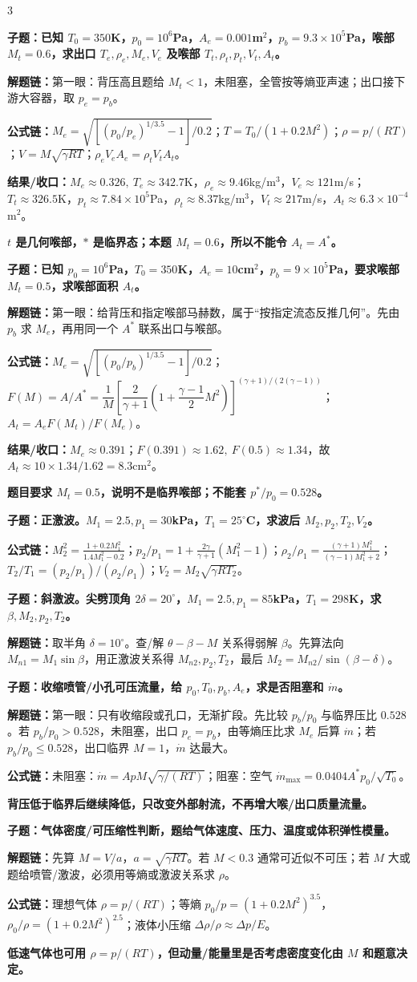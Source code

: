 \documentclass[a4paper]{article}
\newcommand{\qt}[1]{\vspace{0.25pt}\colorbox{Q}{\parbox{\dimexpr\linewidth-2\fboxsep}{\color{white}\bfseries #1}}\par}
\newcommand{\warn}[1]{\colorbox{Y}{\parbox{\dimexpr\linewidth-2\fboxsep}{\color{E}\bfseries #1}}\par}
\newcommand{\chain}[1]{{\color{A}\bfseries 解题链：}#1\par}
\newcommand{\res}[1]{{\color{E}\bfseries 结果/收口：}#1\par}
\newcommand{\form}[1]{{\color{M}\bfseries 公式链：}#1\par}
\begin{document}
\begin{multicols}{3}
\qt{子题：已知 $T_0=350$K，$p_0=10^6$Pa，$A_e=0.001$m$^2$，$p_b=9.3\times10^5$Pa，喉部 $M_t=0.6$，求出口 $T_e,\rho_e,M_e,V_e$ 及喉部 $T_t,\rho_t,p_t,V_t,A_t$。}
\chain{第一眼：背压高且题给 $M_t<1$，未阻塞，全管按等熵亚声速；出口接下游大容器，取 $p_e=p_b$。}
\form{$M_e=\sqrt{[(p_0/p_e)^{1/3.5}-1]/0.2}$；$T=T_0/(1+0.2M^2)$；$\rho=p/(RT)$；$V=M\sqrt{\gamma RT}$；$\rho_eV_eA_e=\rho_tV_tA_t$。}
\res{$M_e\approx0.326,\ T_e\approx342.7$K，$\rho_e\approx9.46$kg/m$^3$，$V_e\approx121$m/s；$T_t\approx326.5$K，$p_t\approx7.84\times10^5$Pa，$\rho_t\approx8.37$kg/m$^3$，$V_t\approx217$m/s，$A_t\approx6.3\times10^{-4}$m$^2$。}
\warn{$t$ 是几何喉部，$*$ 是临界态；本题 $M_t=0.6$，所以不能令 $A_t=A^*$。}

\qt{子题：已知 $p_0=10^6$Pa，$T_0=350$K，$A_e=10$cm$^2$，$p_b=9\times10^5$Pa，要求喉部 $M_t=0.5$，求喉部面积 $A_t$。}
\chain{第一眼：给背压和指定喉部马赫数，属于“按指定流态反推几何”。先由 $p_b$ 求 $M_e$，再用同一个 $A^*$ 联系出口与喉部。}
\form{$M_e=\sqrt{[(p_0/p_b)^{1/3.5}-1]/0.2}$；$F(M)=A/A^*=\dfrac1M\left[\dfrac{2}{\gamma+1}\left(1+\dfrac{\gamma-1}{2}M^2\right)\right]^{(\gamma+1)/(2(\gamma-1))}$；$A_t=A_eF(M_t)/F(M_e)$。}
\res{$M_e\approx0.391$；$F(0.391)\approx1.62,\ F(0.5)\approx1.34$，故 $A_t\approx10\times1.34/1.62=8.3$cm$^2$。}
\warn{题目要求 $M_t=0.5$，说明不是临界喉部；不能套 $p^*/p_0=0.528$。}

\qt{子题：正激波。$M_1=2.5,p_1=30$kPa，$T_1=25^\circ$C，求波后 $M_2,p_2,T_2,V_2$。}
\form{$M_2^2=\frac{1+0.2M_1^2}{1.4M_1^2-0.2}$；$p_2/p_1=1+\frac{2\gamma}{\gamma+1}(M_1^2-1)$；$\rho_2/\rho_1=\frac{(\gamma+1)M_1^2}{(\gamma-1)M_1^2+2}$；$T_2/T_1=(p_2/p_1)/(\rho_2/\rho_1)$；$V_2=M_2\sqrt{\gamma RT_2}$。}

\qt{子题：斜激波。尖劈顶角 $2\delta=20^\circ$，$M_1=2.5,p_1=85$kPa，$T_1=298$K，求 $\beta,M_2,p_2,T_2$。}
\chain{取半角 $\delta=10^\circ$。查/解 $\theta-\beta-M$ 关系得弱解 $\beta$。先算法向 $M_{n1}=M_1\sin\beta$，用正激波关系得 $M_{n2},p_2,T_2$，最后 $M_2=M_{n2}/\sin(\beta-\delta)$。}

\qt{子题：收缩喷管/小孔可压流量，给 $p_0,T_0,p_b,A_e$，求是否阻塞和 $\dot m$。}
\chain{第一眼：只有收缩段或孔口，无渐扩段。先比较 $p_b/p_0$ 与临界压比 $0.528$。若 $p_b/p_0>0.528$，未阻塞，出口 $p_e=p_b$，由等熵压比求 $M_e$ 后算 $\dot m$；若 $p_b/p_0\le0.528$，出口临界 $M=1$，$\dot m$ 达最大。}
\form{未阻塞：$\dot m=A p M\sqrt{\gamma/(RT)}$；阻塞：空气 $\dot m_{\max}=0.0404 A^*p_0/\sqrt{T_0}$。}
\warn{背压低于临界后继续降低，只改变外部射流，不再增大喉/出口质量流量。}

\qt{子题：气体密度/可压缩性判断，题给气体速度、压力、温度或体积弹性模量。}
\chain{先算 $M=V/a$，$a=\sqrt{\gamma RT}$。若 $M<0.3$ 通常可近似不可压；若 $M$ 大或题给喷管/激波，必须用等熵或激波关系求 $\rho$。}
\form{理想气体 $\rho=p/(RT)$；等熵 $p_0/p=(1+0.2M^2)^{3.5}$，$\rho_0/\rho=(1+0.2M^2)^{2.5}$；液体小压缩 $\Delta\rho/\rho\approx\Delta p/E$。}
\warn{低速气体也可用 $\rho=p/(RT)$，但动量/能量里是否考虑密度变化由 $M$ 和题意决定。}


\end{multicols}
\end{document}
